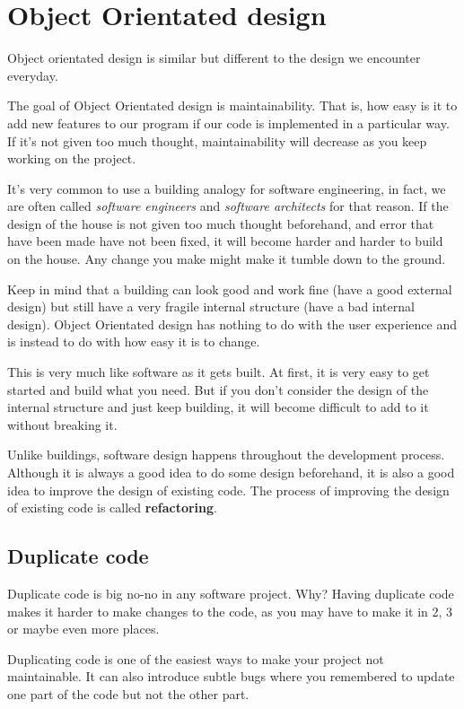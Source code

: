 \documentclass{article}
\begin{document}
  \section*{Object Orientated design}
  Object orientated design is similar but different to the design we encounter
  everyday.

  The goal of Object Orientated design is maintainability. That is, how easy is
  it to add new features to our program if our code is implemented in a particular
  way. If it's not given too much thought, maintainability will decrease as
  you keep working on the project.

  It's very common to use a building analogy for software engineering, in fact,
  we are often called \textit{software engineers} and \textit{software architects} for that
  reason. If the design of the house is not given too much thought beforehand,
  and error that have been made have not been fixed, it will become harder and
  harder to build on the house. Any change you make might make it tumble down
  to the ground.

  Keep in mind that a building can look good and work fine (have a good external
  design) but still have a very fragile internal structure (have a bad internal
  design). Object Orientated design has nothing to do with the user experience
  and is instead to do with how easy it is to change.

  This is very much like software as it gets built. At first, it is very easy
  to get started and build what you need. But if you don't consider the design
  of the internal structure and just keep building, it will become difficult
  to add to it without breaking it.

  Unlike buildings, software design happens throughout the development process.
  Although it is always a good idea to do some design beforehand, it is also
  a good idea to improve the design of existing code. The process of improving
  the design of existing code is called \textbf{refactoring}.

  \subsection*{Duplicate code}
  Duplicate code is big no-no in any software project. Why? Having duplicate
  code makes it harder to make changes to the code, as you may have to make it
  in 2, 3 or maybe even more places.
  
  Duplicating code is one of the easiest ways to make your project not maintainable.
  It can also introduce subtle bugs where you remembered to update one part of
  the code but not the other part.
\end{document}
